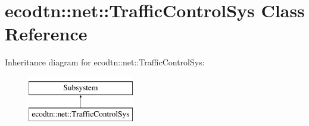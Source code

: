 \hypertarget{classecodtn_1_1net_1_1TrafficControlSys}{}\section{ecodtn\+:\+:net\+:\+:Traffic\+Control\+Sys Class Reference}
\label{classecodtn_1_1net_1_1TrafficControlSys}
Inheritance diagram for ecodtn\+:\+:net\+:\+:Traffic\+Control\+Sys\+:\begin{figure}[H]
\begin{center}
\leavevmode
\includegraphics[height=2.000000cm]{classecodtn_1_1net_1_1TrafficControlSys}
\end{center}
\end{figure}
